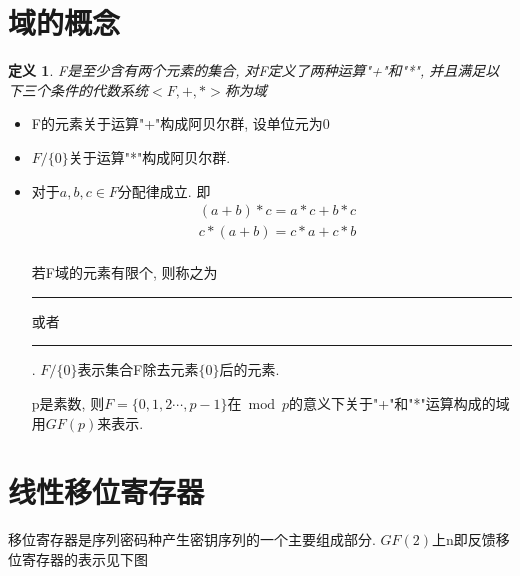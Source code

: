 \documentclass[UTF8]{ctexart}
\newcommand\hl{\bgroup\markoverwith
  {\textcolor{yellow}{\rule[-.5ex]{2pt}{2.5ex}}}\ULon}
\newtheorem{definition}{\hspace{2em}定义}[section]
\begin{document}
\section{域的概念}
\begin{definition}
  F是至少含有两个元素的集合, 对F定义了两种运算"+"和"*", 并且满足以下三个条件的代数系统$<F,+,*>$称为域
\end{definition}
  \begin{itemize}
    \item F的元素关于运算"+"构成阿贝尔群, 设单位元为0
    \item $F/\{0\}$关于运算"*"构成阿贝尔群.
    \item 对于$a,b,c\in F$分配律成立. 即
    $$
    \begin{aligned}
      &(a+b)*c=a*c+b*c\\
      &c*(a+b)=c*a+c*b\\
    \end{aligned}
    $$

    若F域的元素有限个, 则称之为\hl{有限域}或者\hl{伽罗瓦域}. $F/\{0\}$表示集合F除去元素$\{0\}$后的元素.

    p是素数, 则$F=\{0,1,2\cdots, p-1\}$在$\bmod p$的意义下关于"+"和"*"运算构成的域用$GF(p)$来表示.
  \end{itemize}

\section{线性移位寄存器}
  移位寄存器是序列密码种产生密钥序列的一个主要组成部分. $GF(2)$上n即反馈移位寄存器的表示见下图
\end{document}
